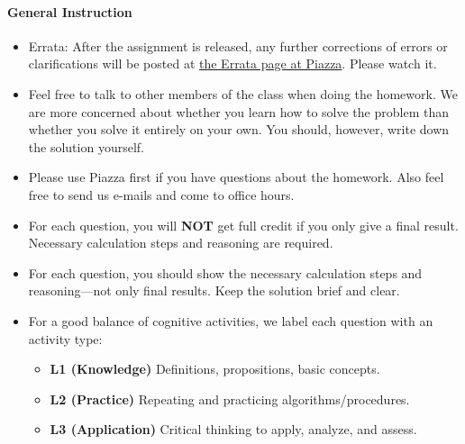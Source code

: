 \paragraph*{General Instruction}
\begin{itemize}
\setlength{\itemsep}{2pt}
\item Errata: After the assignment is released, any further corrections of errors or clarifications will be posted at \href{https://piazza.com/class/idqujg4tiae3q0?cid=152}{the Errata page at Piazza}. Please watch it.
\item Feel free to talk to other members of the class when doing the homework. We are more concerned about
whether you learn how to solve the problem than whether you solve it entirely on your
own. You should, however, write down the solution yourself. 
\item Please use Piazza first if you have questions about the homework. Also feel free to send us e-mails and come to office hours. 
\item For each question, you will \textbf{NOT} get full credit if you only give a final result. Necessary calculation steps and reasoning are required. 
\item For each question, you should show the necessary calculation steps and reasoning---not only final results. Keep the solution brief and clear.
\item For a good balance of cognitive activities, we label each question with an activity type:
\begin{itemize}
\item {\bf L1 (Knowledge)} Definitions, propositions, basic concepts.
\item {\bf L2 (Practice)} Repeating and practicing algorithms/procedures.
\item {\bf L3 (Application)} Critical thinking to apply, analyze, and assess.
\end{itemize}
\end{itemize}

